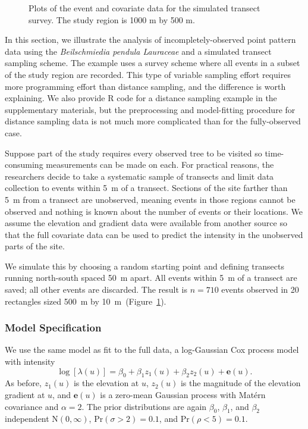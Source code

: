 \documentclass{interact}
\begin{document}
\begin{figure}[p!]
\caption{Plots of the event and covariate data for the simulated transect
survey. The study region is 1000 m by 500 m.}
\label{effort}
\end{figure}

In this section, we illustrate the analysis of incompletely-observed point
pattern data using the \emph{Beilschmiedia pendula Lauraceae} and a simulated
transect sampling scheme. The example uses a survey scheme where all events in
a subset of the study region are recorded. This type of variable sampling
effort requires more programming effort than distance sampling, and the
difference is worth explaining. We also provide R code for a distance sampling
example in the supplementary materials, but the preprocessing and model-fitting
procedure for distance sampling data is not much more complicated than for the
fully-observed case.

Suppose part of the study requires every observed tree to be visited so
time-consuming measurements can be made on each. For practical reasons, the
researchers decide to take a systematic sample of transects and limit data
collection to events within 5~m of a transect. Sections of the site farther
than 5~m from a transect are unobserved, meaning events in those regions
cannot be observed and nothing is known about the number of events or their
locations. We assume the elevation and gradient data were available from
another source so that the full covariate data can be used to predict the
intensity in the unobserved parts of the site.

We simulate this by choosing a random starting point and defining transects
running north-south spaced 50~m apart. All events within 5~m of a transect are
saved; all other events are discarded. The result is \(n = 710\) events
observed in 20 rectangles sized 500~m by 10~m~(Figure~\ref{effort}).


\subsubsection{Model Specification}
\label{xsectmodel}

We use the same model as fit to the full data, a log-Gaussian Cox process model
with intensity
\begin{equation}
\log\left[\lambda(u)\right] = \beta_{0} + \beta_{1} z_{1}(u)
+ \beta_{2} z_{2}(u) + \mathbf{e}(u).
\end{equation}
As before, \(z_{1}(u)\) is the elevation at \(u\), \(z_{2}(u)\) is the
magnitude of the elevation gradient at \(u\), and \(\mathbf{e}(u)\) is a
zero-mean Gaussian process with Mat\'{e}rn covariance and \(\alpha = 2\).
The prior distributions are again \(\beta_{0}\), \(\beta_{1}\), and
\(\beta_{2}\) independent \(\mathrm{N}(0, \infty)\),
\(\mathrm{Pr}(\sigma > 2) = 0.1\), and \(\mathrm{Pr}(\rho < 5) = 0.1\).
\end{document}
